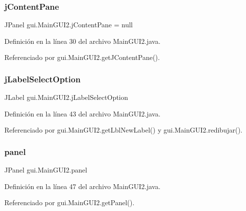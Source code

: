 \subsubsection{\texorpdfstring{jContentPane}{jContentPane}}
{\footnotesize\ttfamily J\+Panel gui.\+Main\+G\+U\+I2.\+j\+Content\+Pane = null\hspace{0.3cm}{\ttfamily [private]}}



Definición en la línea 30 del archivo Main\+G\+U\+I2.\+java.



Referenciado por gui.\+Main\+G\+U\+I2.\+get\+J\+Content\+Pane().

\mbox{\label{classgui_1_1MainGUI2_a1b9fd8b3c190d8521e221fe758e3e1df}} 
\subsubsection{\texorpdfstring{jLabelSelectOption}{jLabelSelectOption}}
{\footnotesize\ttfamily J\+Label gui.\+Main\+G\+U\+I2.\+j\+Label\+Select\+Option\hspace{0.3cm}{\ttfamily [protected]}}



Definición en la línea 43 del archivo Main\+G\+U\+I2.\+java.



Referenciado por gui.\+Main\+G\+U\+I2.\+get\+Lbl\+New\+Label() y gui.\+Main\+G\+U\+I2.\+redibujar().

\mbox{\label{classgui_1_1MainGUI2_aa9d49687621bbcc74f40c9063adbc2fa}} 
\subsubsection{\texorpdfstring{panel}{panel}}
{\footnotesize\ttfamily J\+Panel gui.\+Main\+G\+U\+I2.\+panel\hspace{0.3cm}{\ttfamily [private]}}



Definición en la línea 47 del archivo Main\+G\+U\+I2.\+java.



Referenciado por gui.\+Main\+G\+U\+I2.\+get\+Panel().

